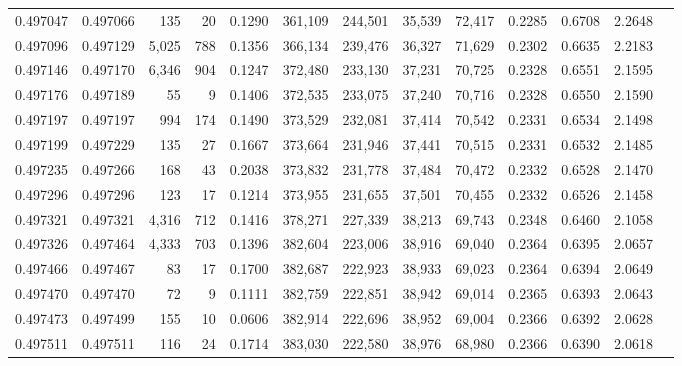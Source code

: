 \begin{tabular}{rrrrrrrrrrrrr}
0.497047 & 0.497066 &   135 &    20 &                                     0.1290 & 361,109 & 244,501 &  35,539 &  72,417 & 0.2285 & 0.6708 & 2.2648 \\
0.497096 & 0.497129 & 5,025 &   788 &                                     0.1356 & 366,134 & 239,476 &  36,327 &  71,629 & 0.2302 & 0.6635 & 2.2183 \\
0.497146 & 0.497170 & 6,346 &   904 &                                     0.1247 & 372,480 & 233,130 &  37,231 &  70,725 & 0.2328 & 0.6551 & 2.1595 \\
0.497176 & 0.497189 &    55 &     9 &                                     0.1406 & 372,535 & 233,075 &  37,240 &  70,716 & 0.2328 & 0.6550 & 2.1590 \\
0.497197 & 0.497197 &   994 &   174 &                                     0.1490 & 373,529 & 232,081 &  37,414 &  70,542 & 0.2331 & 0.6534 & 2.1498 \\
0.497199 & 0.497229 &   135 &    27 &                                     0.1667 & 373,664 & 231,946 &  37,441 &  70,515 & 0.2331 & 0.6532 & 2.1485 \\
0.497235 & 0.497266 &   168 &    43 &                                     0.2038 & 373,832 & 231,778 &  37,484 &  70,472 & 0.2332 & 0.6528 & 2.1470 \\
0.497296 & 0.497296 &   123 &    17 &                                     0.1214 & 373,955 & 231,655 &  37,501 &  70,455 & 0.2332 & 0.6526 & 2.1458 \\
0.497321 & 0.497321 & 4,316 &   712 &                                     0.1416 & 378,271 & 227,339 &  38,213 &  69,743 & 0.2348 & 0.6460 & 2.1058 \\
0.497326 & 0.497464 & 4,333 &   703 &                                     0.1396 & 382,604 & 223,006 &  38,916 &  69,040 & 0.2364 & 0.6395 & 2.0657 \\
0.497466 & 0.497467 &    83 &    17 &                                     0.1700 & 382,687 & 222,923 &  38,933 &  69,023 & 0.2364 & 0.6394 & 2.0649 \\
0.497470 & 0.497470 &    72 &     9 &                                     0.1111 & 382,759 & 222,851 &  38,942 &  69,014 & 0.2365 & 0.6393 & 2.0643 \\
0.497473 & 0.497499 &   155 &    10 &                                     0.0606 & 382,914 & 222,696 &  38,952 &  69,004 & 0.2366 & 0.6392 & 2.0628 \\
0.497511 & 0.497511 &   116 &    24 &                                     0.1714 & 383,030 & 222,580 &  38,976 &  68,980 & 0.2366 & 0.6390 & 2.0618 \\

\end{tabular}
